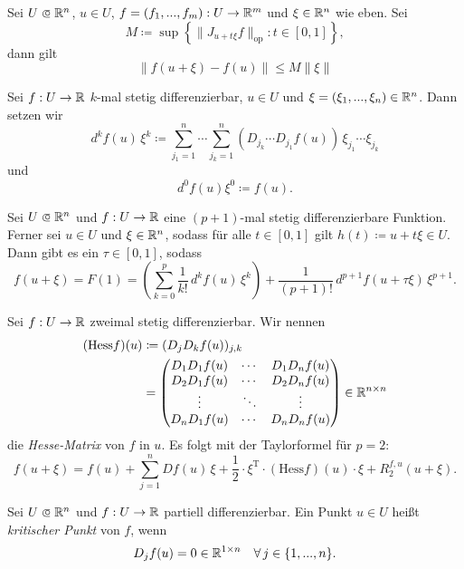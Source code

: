 \documentclass{cheat-sheet}
\begin{document}
\begin{kor}[Schrankensatz]
Sei $U \opn \R^n$, $u \in U$, $f = (f_1, ..., f_m) : U \to \mathbb{R}^m$ und $\xi \in \mathbb{R}^n$ wie eben. Sei
\[ M \coloneqq \sup \left\{ \| J_{u + t \xi} f \|_{\text{op}} : t \in [0, 1] \right\}, \]
dann gilt
\[ \| f(u + \xi) - f(u) \| \le M \| \xi \| \]
\end{kor}

\begin{nota}
Sei $f : U \to \mathbb{R}$ $k$-mal stetig differenzierbar, $u \in U$ und $\xi = (\xi_1, ..., \xi_n) \in \mathbb{R}^n$. Dann setzen wir
\[ d^k f(u)\,\xi^k \coloneqq \sum_{j_1=1}^n \cdots \sum_{j_k=1}^n (D_{j_k} \cdots D_{j_1} f(u))\,\xi_{j_1}\cdots\xi_{j_k} \]
und
\[ d^0 f(u) \xi^0 \coloneqq f(u). \]
\end{nota}

\begin{satz}
Sei $U \opn \R^n$ und $f : U \to \mathbb{R}$ eine $(p + 1)$-mal stetig differenzierbare Funktion. Ferner sei $u \in U$ und $\xi \in \mathbb{R}^n$, sodass für alle $t \in [0, 1]$ gilt $h(t) \coloneqq u + t \xi \in U$. Dann gibt es ein $\tau \in [0, 1]$, sodass
\[ f(u + \xi) = F(1) = \left( \sum_{k=0}^{p} \frac{1}{k!}\,d^k f(u)\,\xi^k \right) + \frac{1}{(p + 1)!}\,d^{p+1} f(u + \tau \xi)\,\xi^{p+1}. \]
\end{satz}

\begin{bem}[Taylorformel für $p = 2$]
Sei $f : U \to \mathbb{R}$ zweimal stetig differenzierbar. Wir nennen
\begin{align*}
  (\mathrm{Hess} f)(u) &\coloneqq (D_j D_k f(u))_{j,k}\\
  &= \begin{pmatrix} D_1 D_1 f(u) & \cdots & D_1 D_n f(u) \\ D_2 D_1 f(u) & \cdots & D_2 D_n f(u) \\ \vdots & \ddots & \vdots \\ D_n D_1 f(u) & \cdots & D_n D_n f(u) \end{pmatrix} \in \mathbb{R}^{n \times n}
\end{align*}
die \emph{Hesse-Matrix} von $f$ in $u$. Es folgt mit der Taylorformel für $p = 2$:
\[ f(u + \xi) = f(u) + \sum_{j=1}^{n} D f(u)\,\xi + \frac{1}{2} \cdot \xi^{\text{T}} \cdot (\mathrm{Hess} f)(u) \cdot \xi + R_2^{f,u}(u + \xi). \]
\end{bem}

\begin{defn}
Sei $U \opn \R^n$ und $f : U \to \mathbb{R}$ partiell differenzierbar. Ein Punkt $u \in U$ heißt \emph{kritischer Punkt} von $f$, wenn
\[ D_j f(u) = 0 \in \mathbb{R}^{1 \times n}\quad \forall\,j \in \{ 1, ..., n \}. \]
\end{defn}
\end{document}

